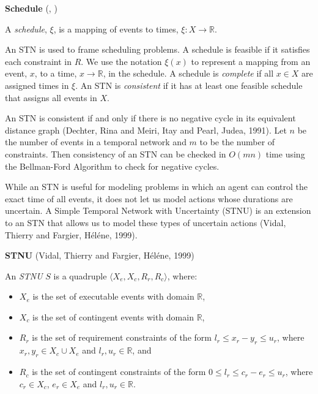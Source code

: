 \documentclass[11pt]{article}
\begin{document}
\begin{defn}
\textbf{Schedule} (, )

A \emph{schedule}, \(\xi\), is a mapping of events to times, \(\xi : X \rightarrow \mathbb{R}\).
\end{defn}

An STN is used to frame scheduling problems. A schedule is feasible if it satisfies each constraint
in \(R\). We use the notation \(\xi(x)\) to represent a mapping from an event, \(x\), to a time, \(x
\rightarrow \mathbb{R}\), in the schedule. A schedule is \emph{complete} if all \(x \in X\) are assigned
times in \(\xi\). An STN is \emph{consistent} if it has at least one feasible schedule that assigns all
events in \(X\).

An STN is consistent if and only if there is no negative cycle in its equivalent distance graph
(Dechter, Rina and Meiri, Itay and Pearl, Judea, 1991). Let \(n\) be the number of events in a temporal network and \(m\) to be the number
of constraints. Then consistency of an STN can be checked in \(O(mn)\) time using the Bellman-Ford
Algorithm to check for negative cycles.

While an STN is useful for modeling problems in which an agent can control the exact time of all
events, it does not let us model actions whose durations are uncertain. A Simple Temporal Network
with Uncertainty (STNU) is an extension to an STN that allows us to model these types of uncertain
actions (Vidal, Thierry and Fargier, H{\'e}l{\'e}ne, 1999).

\begin{defn}
\label{def:stnus}
\textbf{STNU} (Vidal, Thierry and Fargier, H{\'e}l{\'e}ne, 1999)

An \emph{STNU} \(S\) is a quadruple \(\langle X_e, X_c, R_r, R_c \rangle\), where:
\begin{itemize}
\item \(X_e\) is the set of executable events with domain \(\mathbb{R}\),
\item \(X_c\) is the set of contingent events with domain \(\mathbb{R}\),
\item \(R_r\) is the set of requirement constraints of the form \(l_r \leq x_r - y_r \leq u_r\), where \(x_r,
  y_r \in X_c \cup X_e\) and \(l_r, u_r \in \mathbb{R}\), and
\item \(R_c\) is the set of contingent constraints of the form \(0 \leq l_r \leq c_r - e_r \leq u_r\), where
\(c_r \in X_c\), \(e_r \in X_e\) and \(l_r, u_r \in \mathbb{R}\).
\end{itemize}
\end{defn}
\end{document}
